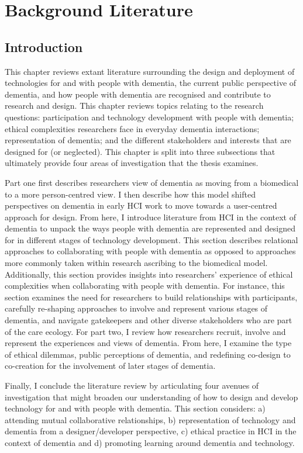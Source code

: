 \chapter{Background Literature}
\label{BackgroundLit}

\section{Introduction}
\label{BL:Intro}
This chapter reviews extant literature surrounding the design and deployment of technologies for and with people with dementia, the current public perspective of dementia, and how people with dementia are recognised and contribute to research and design. This chapter reviews topics relating to the research questions: participation and technology development with people with dementia; ethical complexities researchers face in everyday dementia interactions; representation of dementia; and the different stakeholders and interests that are designed for (or neglected). This chapter is split into three subsections that ultimately provide four areas of investigation that the thesis examines.

Part one first describes researchers view of dementia as moving from a biomedical to a more person-centred view. I then describe how this model shifted perspectives on dementia in early HCI work to move towards a user-centred approach for design. From here, I introduce literature from HCI in the context of dementia to unpack the ways people with dementia are represented and designed for in different stages of technology development. This section describes relational approaches to collaborating with people with dementia as opposed to approaches more commonly taken within research ascribing to the biomedical model. Additionally, this section provides insights into researchers' experience of ethical complexities when collaborating with people with dementia. For instance, this section examines the need for researchers to build relationships with participants, carefully re-shaping approaches to involve and represent various stages of dementia, and navigate gatekeepers and other diverse stakeholders who are part of the care ecology. For part two, I review how researchers recruit, involve and represent the experiences and views of dementia. From here, I examine the type of ethical dilemmas, public perceptions of dementia, and redefining co-design to co-creation for the involvement of later stages of dementia.

Finally, I conclude the literature review by articulating four avenues of investigation that might broaden our understanding of how to design and develop technology for and with people with dementia. This section considers: a) attending mutual collaborative relationships, b) representation of technology and dementia from a designer/developer perspective, c) ethical practice in HCI in the context of dementia and d) promoting learning around dementia and technology.

